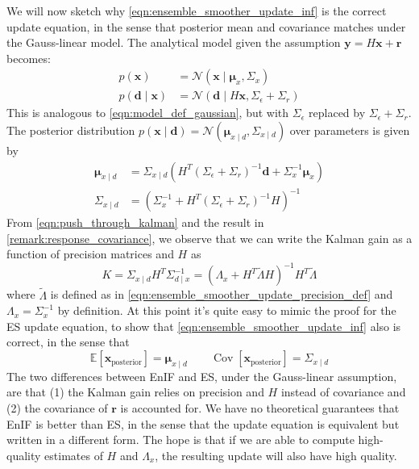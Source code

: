 \documentclass[12pt, a4paper]{article}
\theoremstyle{spaced}
\theoremstyle{spaceddef}
\numberwithin{equation}{section}
\begin{document}
We will now sketch why \cref{eqn:ensemble_smoother_update_inf} is the correct update equation, in the sense that posterior mean and covariance matches under the Gauss-linear model.
The analytical model given the assumption $\bm{y} = H \bm{x} + \bm{r}$ becomes:
\begin{align*}
    p(\bm{x}) &= \mathcal{N}\left( \bm{x} \mid \bm{\mu}_x, \Sigma_x \right) \\
    p(\bm{d} \mid \bm{x}) &= \mathcal{N}( \bm{d} \mid H\bm{x}, \Sigma_{\epsilon} + \Sigma_{r})
\end{align*}
This is analogous to \cref{eqn:model_def_gaussian}, but with $\Sigma_{\epsilon}$ replaced by $\Sigma_{\epsilon} + \Sigma_{r}$.
The posterior distribution $p(\bm{x} \mid \bm{d}) = \mathcal{N} (\bm{\mu}_{x \mid d}, \Sigma_{x \mid d})$ over parameters is given by
\begin{align}
    \bm{\mu}_{x \mid d} &=
    \Sigma_{x \mid d} \left(
    H^T \left( \Sigma_{\epsilon} + \Sigma_{r}  \right)^{-1} \bm{d} + \Sigma_x^{-1} \bm{\mu}_x
    \right)
    \label{eqn:posterior_mean_precision_inf}
    \\
    \Sigma_{x \mid d} &=
    \left( \Sigma_x^{-1} + H^T \left( \Sigma_{\epsilon} + \Sigma_{r}  \right)^{-1} H  \right)^{-1}
    \label{eqn:posterior_cov_precision_inf}
\end{align}
From \cref{eqn:push_through_kalman} and the result in \cref{remark:response_covariance}, we observe that we can write the Kalman gain as a function of precision matrices and $H$ as
\begin{equation*}
    K
    = \Sigma_{x \mid d} H^T \Sigma_{d \mid x}^{-1}
    = ( \Lambda_x + H^T \tilde{\Lambda} H )^{-1} H^T \tilde{\Lambda}
\end{equation*}
where $\tilde{\Lambda}$ is defined as in \cref{eqn:ensemble_smoother_update_precision_def}
and $\Lambda_x = \Sigma_{x}^{-1}$ by definition.
At this point it's quite easy to mimic the proof for the ES update equation, to show that \cref{eqn:ensemble_smoother_update_inf} also is correct, in the sense that
\begin{equation*}
    \mathbb{E} \left[ \bm{x}_{\text{posterior}}  \right] = \bm{\mu}_{x \mid d}
    \qquad
    \operatorname{Cov} \left[ \bm{x}_{\text{posterior}}  \right] = \Sigma_{x \mid d}
\end{equation*}
The two differences between EnIF and ES, under the Gauss-linear assumption, are that (1) the Kalman gain relies on precision and $H$ instead of covariance and (2) the covariance of $\bm{r}$ is accounted for.
We have no theoretical guarantees that EnIF is better than ES, in the sense that the update equation is equivalent but written in a different form.
The hope is that if we are able to compute high-quality estimates of $H$ and $\Lambda_x$, the resulting update will also have high quality.
\end{document}
